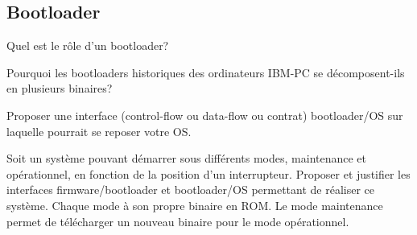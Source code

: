 \begin{questions}
\begin{parts}
  \part{Bootloader}
  \begin{subparts}
    \subpart[1] Quel est le rôle d'un bootloader?

    \subpart[1] Pourquoi les bootloaders historiques des ordinateurs IBM-PC se décomposent-ils en plusieurs binaires?

    \subpart[4] Proposer une interface (control-flow ou data-flow ou contrat) bootloader/OS sur laquelle pourrait se reposer votre OS.
  \end{subparts}

  \bonuspart[1]
Soit un système pouvant démarrer sous différents modes, maintenance et opérationnel, en fonction de la position d'un interrupteur. Proposer et justifier les interfaces firmware/bootloader et bootloader/OS permettant de réaliser ce système. Chaque mode à son propre binaire en ROM. Le mode maintenance permet de télécharger un nouveau binaire pour le mode opérationnel.
\end{parts}

%
%



\end{questions}
